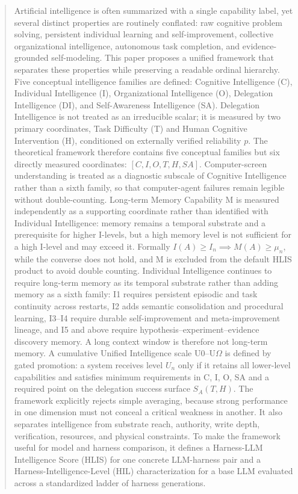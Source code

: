 \documentclass[11pt]{article}
\theoremstyle{definition}
\newcommand{\Om}{\ensuremath{\Omega}}
\newcommand{\SA}{\ensuremath{S_A(T,H)}}
\begin{document}
\begin{abstract}
Artificial intelligence is often summarized with a single capability label, yet several distinct properties are routinely conflated: raw cognitive problem solving, persistent individual learning and self-improvement, collective organizational intelligence, autonomous task completion, and evidence-grounded self-modeling. This paper proposes a unified framework that separates these properties while preserving a readable ordinal hierarchy. Five conceptual intelligence families are defined: Cognitive Intelligence (C), Individual Intelligence (I), Organizational Intelligence (O), Delegation Intelligence (DI), and Self-Awareness Intelligence (SA). Delegation Intelligence is not treated as an irreducible scalar; it is measured by two primary coordinates, Task Difficulty (T) and Human Cognitive Intervention (H), conditioned on externally verified reliability $p$. The theoretical framework therefore contains five conceptual families but six directly measured coordinates: $[C, I, O, T, H, SA]$. Computer-screen understanding is treated as a diagnostic subscale of Cognitive Intelligence rather than a sixth family, so that computer-agent failures remain legible without double-counting. Long-term Memory Capability M is measured independently as a supporting coordinate rather than identified with Individual Intelligence: memory remains a temporal substrate and a prerequisite for higher I-levels, but a high memory level is not sufficient for a high I-level and may exceed it. Formally $I(A) \ge I_n \implies M(A) \ge \mu_n$, while the converse does not hold, and M is excluded from the default HLIS product to avoid double counting. Individual Intelligence continues to require long-term memory as its temporal substrate rather than adding memory as a sixth family: I1 requires persistent episodic and task continuity across restarts, I2 adds semantic consolidation and procedural learning, I3--I4 require durable self-improvement and meta-improvement lineage, and I5 and above require hypothesis--experiment--evidence discovery memory. A long context window is therefore not long-term memory. A cumulative Unified Intelligence scale U0--U\Om{} is defined by gated promotion: a system receives level $U_n$ only if it retains all lower-level capabilities and satisfies minimum requirements in C, I, O, SA and a required point on the delegation success surface \SA{}. The framework explicitly rejects simple averaging, because strong performance in one dimension must not conceal a critical weakness in another. It also separates intelligence from substrate reach, authority, write depth, verification, resources, and physical constraints. To make the framework useful for model and harness comparison, it defines a Harness-LLM Intelligence Score (HLIS) for one concrete LLM-harness pair and a Harness-Intelligence-Level (HIL) characterization for a base LLM evaluated across a standardized ladder of harness generations.


\end{abstract}
\end{document}
